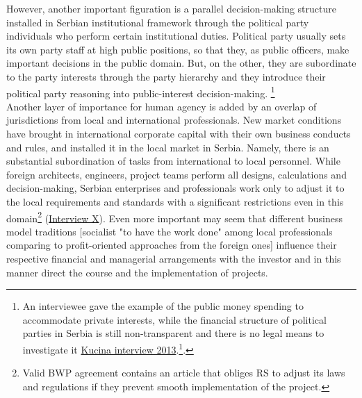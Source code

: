 \documentclass[11pt]{report}
\begin{document}
However, another important figuration is a parallel decision-making structure  installed in Serbian institutional framework through the political party individuals who perform certain institutional duties.
Political party usually sets its own party staff at high public positions, so that they, as public officers, make important decisions in the public domain.
But, on the other, they are subordinate to the party interests through the party hierarchy and they introduce their political party reasoning into public-interest decision-making. \footnote
{An interviewee gave the example of the public money spending to accommodate private interests,
while the financial structure of political parties in Serbia is still non-transparent and there is no legal means to investigate it \href{ref}{Kucina interview 2013}.\footnote{
Another gave the example how a professional in high education had slowly changed his approach to the job during his term as a high officer of the political party in power \href{ref}{Association of architects interview}.}.}
\\
Another layer of importance for human agency is added by an overlap of jurisdictions from local and international professionals.
New market conditions have brought in international corporate capital with their own business conducts and rules, and installed it in the local market in Serbia. Namely, there is an substantial subordination of tasks from international to local personnel.
While foreign architects, engineers, project teams perform all designs, calculations and decision-making, Serbian enterprises and professionals work only to adjust it to the local requirements and standards with a significant restrictions even in this domain\footnote{Valid BWP agreement contains an article that obliges RS to adjust its laws and regulations if they prevent smooth implementation of the project.}  (\href{InterviewX}{Interview X}).
Even more important may seem that different business model traditions [socialist "to have the work done" among local professionals comparing to profit-oriented approaches from the foreign ones]
influence their respective financial and managerial arrangements with the investor and in this manner direct the course and the implementation of projects.
\end{document}
